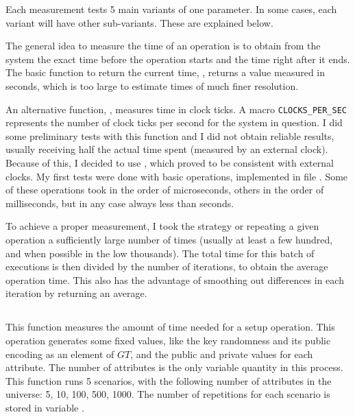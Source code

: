 \documentclass{article}
\begin{document}
Each measurement tests 5 main variants of one parameter. In some cases, each variant will have other sub-variants. These are explained below.

The general idea to measure the time of an operation is to obtain from the system the exact time before the operation starts and the time right after it ends. The basic function to return the current time, , returns a value measured in seconds, which is too large to estimate times of much finer resolution. 

An alternative function, , measures time in clock ticks. A macro \verb|CLOCKS_PER_SEC| represents the number of clock ticks per second for the system in question. I did some preliminary tests with this function and I did not obtain reliable results, usually receiving half the actual time spent (measured by an external clock). Because of this, I decided to use , which proved to be consistent with external clocks. My first tests were done with basic operations, implemented in file . Some of these operations took in the order of microseconds, others in the order of milliseconds, but in any case always less than seconds. 

To achieve a proper measurement, I took the strategy or repeating a given operation a sufficiently large number of times (usually at least a few hundred, and when possible in the low thousands). The total time for this batch of executions is then divided by the number of iterations, to obtain the average operation time. This also has the advantage of smoothing out differences in each iteration by returning an average.

\subsection{}

This function measures the amount of time needed for a setup operation. This operation generates some fixed values, like the key randomness and its public encoding as an element of $GT$, and the public and private values for each attribute. The number of attributes is the only variable quantity in this process. This function runs 5 scenarios, with the following number of attributes in the universe: 5, 10, 100, 500, 1000.
The number of repetitions for each scenario is stored in variable .

\subsection{}
\end{document}
